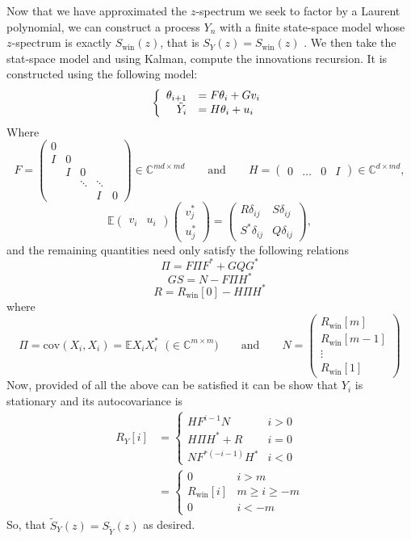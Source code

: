\documentclass[12pt]{amsart}
\renewcommand{\and}{\qquad\text{and}\qquad}
\newcommand{\E}{\mathbb{E}}
\newcommand{\C}{\mathbb{C}}
\renewcommand{\and}{\qquad\text{and}\qquad }
\newcommand{\cov}{\mathrm{cov}}
\begin{document}
Now that we have approximated the $z$-spectrum we seek to factor by a Laurent polynomial, we can construct a process $Y_n$ with a finite state-space model whose $z$-spectrum is exactly $S_\text{win}(z)$, that is $S_{Y}(z) = S_\text{win}(z)$ \cite[p.~488]{sayed2001}. We then take the stat-space model and using Kalman, compute the innovations recursion. It is constructed using the following model:
$$\left\{\begin{array}{ r l}
\theta_{i+1} &= F\theta_i + Gv_i \\
\tilde{Y}_i &= H\theta_i + u_i
\end{array}\right.$$
Where
$$
F = \begin{pmatrix}
0 &   &        &        &   \\
I & 0 &        &        &   \\
& I & 0      &        &   \\
&   & \ddots & \ddots &   \\
&   &        & I      & 0
\end{pmatrix}\in \C^{md\times md}\and 
H = \begin{pmatrix}
0 & \dots  & 0       & I 
\end{pmatrix}\in \C^{d\times md},
$$
$$\E \begin{pmatrix} v_i & u_i \end{pmatrix}\begin{pmatrix} v_j^* \\ u_j^* \end{pmatrix} = 
\begin{pmatrix} R\delta_{ij} & S\delta_{ij} \\ S^*\delta_{ij} & Q\delta_{ij} \end{pmatrix},$$
and the remaining quantities need only satisfy the following relations
$$\Pi = F\Pi F^* + GQG^*$$
$$GS = N - F\Pi H^*$$
$$R = R_\text{win}[0] - H\Pi H^*$$
where 
$$\Pi = \cov(X_i,X_i) = \E X_iX_i^* \;\;\Big(\!\in \C^{m\times m}\Big) \and 
N = \begin{pmatrix} R_\text{win}[m] \\ R_\text{win}[m-1] \\ \vdots \\ R_\text{win}[1] \end{pmatrix}$$ 
Now, provided of all the above can be satisfied it can be show that $Y_i$ is stationary and its autocovariance is
\begin{align*}
	R_{Y}[i] &= \begin{cases}
		HF^{i-1}N & i > 0 \\
		H\Pi H^* + R & i = 0 \\
		NF^{*(-i-1)}H^* & i < 0
	\end{cases} \\
	&=\begin{cases}
		0 & i > m \\
		R_\text{win}[i]& m \ge i \ge -m \\
		0 & i < -m
	\end{cases} 
\end{align*}
So, that $\tilde{S}_Y(z) = S_{\tilde{Y}}(z)$ as desired. 
\end{document}
